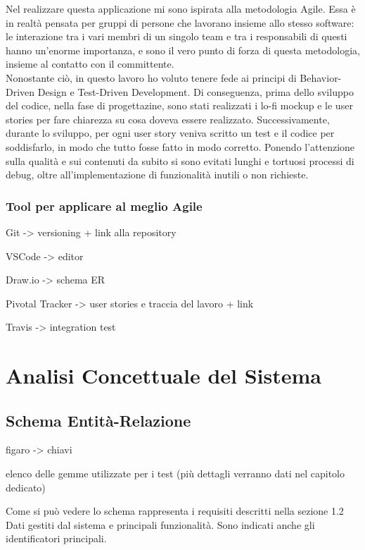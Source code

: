\documentclass[Lau, binding=0.6cm]{sapthesis}
\begin{document}
Nel realizzare questa applicazione mi sono ispirata alla metodologia Agile. Essa è in realtà pensata per gruppi di persone che lavorano insieme allo stesso software: le interazione tra i vari membri di un singolo team e tra i responsabili di questi hanno un'enorme importanza, e sono il vero punto di forza di questa metodologia, insieme al contatto con il committente.\\
Nonostante ciò, in questo lavoro ho voluto tenere fede ai principi di Behavior-Driven Design e Test-Driven Development. Di conseguenza, prima dello sviluppo del codice, nella fase di progettazine, sono stati realizzati i lo-fi mockup e le user stories per fare chiarezza su cosa doveva essere realizzato. Successivamente, durante lo sviluppo, per ogni user story veniva scritto un test e il codice per soddisfarlo, in modo che tutto fosse fatto in modo corretto. Ponendo l'attenzione sulla qualità e sui contenuti da subito si sono evitati lunghi e tortuosi processi di debug, oltre all'implementazione di funzionalità inutili o non richieste.

\subsection{Tool per applicare al meglio Agile}

Git -> versioning + link alla repository

VSCode -> editor

Draw.io -> schema ER

Pivotal Tracker -> user stories e traccia del lavoro + link

Travis -> integration test

\chapter{Analisi Concettuale del Sistema}

\section{Schema Entità-Relazione}

figaro -> chiavi

elenco delle gemme utilizzate per i test (più dettagli verranno dati nel capitolo dedicato) 


Come si può vedere lo schema rappresenta i requisiti descritti nella sezione 1.2 Dati gestiti dal sistema e principali funzionalità.
Sono indicati anche gli identificatori principali.
\end{document}
